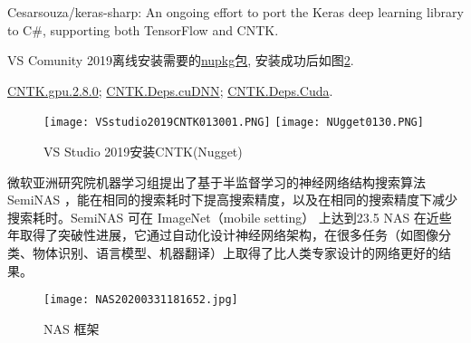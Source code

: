 Cesarsouza/keras-sharp: An ongoing effort to port the Keras deep learning library to C\#, supporting both TensorFlow and CNTK.

VS Comunity 2019离线安装需要的\href{https://www.nuget.org/packages?q=CNTK.GPU}{nupkg包}, 安装成功后如图\ref{VSstudio2019CNTK013001}.

\href{https://globalcdn.nuget.org/packages/cntk.gpu.2.8.0-rc0.dev20200126.nupkg}{CNTK.gpu.2.8.0};
\href{https://www.nuget.org/api/v2/package/CNTK.Deps.cuDNN/2.8.0-rc0.dev20200127}{CNTK.Deps.cuDNN};
\href{https://www.nuget.org/packages/CNTK.Deps.Cuda/}{CNTK.Deps.Cuda}.

\begin{figure}[H]
\centering
\texttt{[image: VSstudio2019CNTK013001.PNG]}
\texttt{[image: NUgget0130.PNG]}
\caption{VS Studio 2019安装CNTK(Nugget)}
\label{VSstudio2019CNTK013001}
\end{figure}

微软亚洲研究院机器学习组提出了基于半监督学习的神经网络结构搜索算法 SemiNAS ，能在相同的搜索耗时下提高搜索精度，以及在相同的搜索精度下减少搜索耗时。SemiNAS 可在 ImageNet（mobile setting） 上达到23.5%
NAS 在近些年取得了突破性进展，它通过自动化设计神经网络架构，在很多任务（如图像分类、物体识别、语言模型、机器翻译）上取得了比人类专家设计的网络更好的结果。
\begin{figure}[H]
\centering
\texttt{[image: NAS20200331181652.jpg]}
\caption{NAS 框架}
\label{VSstudio2019CNTK013001}
\end{figure}

